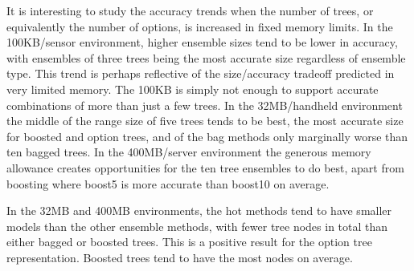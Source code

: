 It is interesting to study the accuracy trends when the number of trees, or equivalently the number of options, is increased in fixed memory limits. In the 100KB/sensor environment, higher ensemble sizes tend to be lower in accuracy, with ensembles of three trees being the most accurate size regardless of ensemble type. This trend is perhaps reflective of the size/accuracy tradeoff predicted in very limited memory. The 100KB is simply not enough to support accurate combinations of more than just a few trees.
In the 32MB/handheld environment the middle of the range size of five trees tends to be best, the most accurate size for boosted and option trees, and of the {\sc bag} methods only marginally worse than ten bagged trees. In the 400MB/server environment the generous memory allowance creates opportunities for the ten tree ensembles to do best, apart from boosting where {\sc boost5} is more accurate than {\sc boost10} on average.

In the 32MB and 400MB environments, the {\sc hot} methods tend to have smaller models than the other ensemble methods, with fewer tree nodes in total than either bagged or boosted trees. This is a positive result for the option tree representation. Boosted trees tend to have the most nodes on average.

